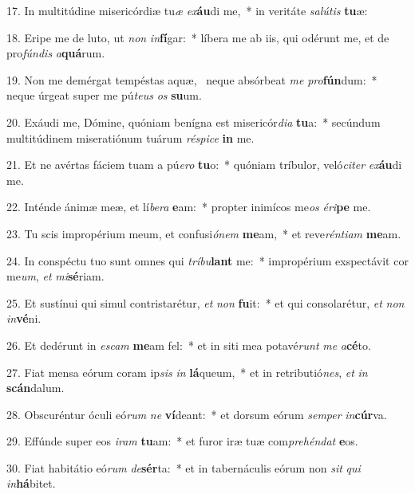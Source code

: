 17. In multitúdine misericórdiæ tu\textit{æ} \textit{ex}\textbf{áu}di me,~*  in veritáte \textit{sa}\textit{lú}\textit{tis} \textbf{tu}æ:\

18. Eripe me de luto, ut \textit{non} \textit{in}\textbf{fí}gar:~*  líbera me ab iis, qui odérunt me, et de pro\textit{fún}\textit{dis} \textit{a}\textbf{quá}rum.\

19. Non me demérgat tempéstas aquæ, \dag\  neque absórbeat \textit{me} \textit{pro}\textbf{fún}dum:~*  neque úrgeat super me pú\textit{te}\textit{us} \textit{os} \textbf{su}um.\

20. Exáudi me, Dómine, quóniam benígna est misericór\textit{di}\textit{a} \textbf{tu}a:~*  secúndum multitúdinem miseratiónum tuárum \textit{ré}\textit{spi}\textit{ce} \textbf{in} me.\

21. Et ne avértas fáciem tuam a pú\textit{e}\textit{ro} \textbf{tu}o:~*  quóniam tríbulor, veló\textit{ci}\textit{ter} \textit{ex}\textbf{áu}di me.\

22. Inténde ánimæ meæ, et lí\textit{be}\textit{ra} \textbf{e}am:~*  propter inimícos me\textit{os} \textit{é}\textit{ri}\textbf{pe} me.\

23. Tu scis impropérium meum, et confusi\textit{ó}\textit{nem} \textbf{me}am,~*  et reve\textit{rén}\textit{ti}\textit{am} \textbf{me}am.\

24. In conspéctu tuo sunt omnes qui \textit{trí}\textit{bu}\textbf{lant} me:~*  impropérium exspectávit cor me\textit{um}, \textit{et} \textit{mi}\textbf{sé}riam.\

25. Et sustínui qui simul contristarétur, \textit{et} \textit{non} \textbf{fu}it:~*  et qui consolarétur, \textit{et} \textit{non} \textit{in}\textbf{vé}ni.\

26. Et dedérunt in \textit{es}\textit{cam} \textbf{me}am fel:~*  et in siti mea potavé\textit{runt} \textit{me} \textit{a}\textbf{cé}to.\

27. Fiat mensa eórum coram ip\textit{sis} \textit{in} \textbf{lá}queum,~*  et in retributió\textit{nes}, \textit{et} \textit{in} \textbf{scán}dalum.\

28. Obscuréntur óculi eó\textit{rum} \textit{ne} \textbf{ví}deant:~*  et dorsum eórum \textit{sem}\textit{per} \textit{in}\textbf{cúr}va.\

29. Effúnde super eos \textit{i}\textit{ram} \textbf{tu}am:~*  et furor iræ tuæ com\textit{pre}\textit{hén}\textit{dat} \textbf{e}os.\

30. Fiat habitátio eó\textit{rum} \textit{de}\textbf{sér}ta:~*  et in tabernáculis eórum non \textit{sit} \textit{qui} \textit{in}\textbf{há}bitet.\

